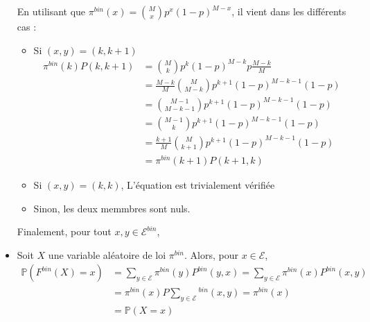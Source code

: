 \documentclass[a4paper,11pt]{article}
\def \P{\mathbb{P}}
\def \E{\mathcal{E}}
\begin{document}
\begin{itemize}
En utilisant que $\pi^{bin}(x)  = \binom{M}{x}p^x(1-p)^{M-x}$, il vient dans les différents cas :

	\begin{itemize}
		\item 	Si $(x,y) = (k,k+1)$
			\begin{equation*}	
			\begin{split}
			\pi^{bin}(k)P(k,k+1) &= \binom{M}{k}p^k(1-p)^{M-k}p\frac{M-k}{M} \\
			&= \frac{M-k}{M}\binom{M}{M-k}p^{k+1}(1-p)^{M-k-1}(1-p)\\
			&= \binom{M-1}{M-k-1}p^{k+1}(1-p)^{M-k-1}(1-p)\\
			&= \binom{M-1}{k}p^{k+1}(1-p)^{M-k-1}(1-p)\\
			&= \frac{k+1}{M}\binom{M}{k+1}p^{k+1}(1-p)^{M-k-1}(1-p)\\
			&= \pi^{bin}(k+1)P(k+1,k) 
			\end{split}
			\end{equation*}
		\item   Si $(x,y) = (k,k)$, L'équation est trivialement vérifiée
		\item   Sinon, les deux memmbres sont nuls.
	\end{itemize}
		Finalement, pour tout $x,y \in \E^{bin}$, 
\begin{center}
\end{center}

\item[\textbullet]
Soit $X$ une variable aléatoire de loi $\pi^{bin}$. Alors, pour $x\in \E$,
\begin{equation*}
\begin{split}
 \P(F^{bin}(X)=x) &= \sum_{y\in\E}{\pi^{bin}(y)P^{bin}(y,x)}
		  = \sum_{y\in\E}{\pi^{bin}(x)P^{bin}(x,y)}\\
		  &= \pi^{bin}(x)P\sum_{y\in\E}{^{bin}(x,y)}
		  = \pi^{bin}(x)\\
		  &= \P(X=x) 
\end{split}
\end{equation*}
\begin{center}
\end{center}

\end{itemize}
\end{document}
